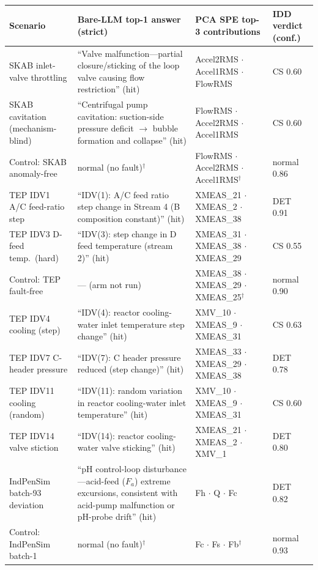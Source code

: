 \documentclass[preprint,10pt]{elsarticle}
\newcommand{\preprinttabfit}{\scriptsize\selectfont}%
\newcommand{\preprinttabfit}{}%
\begin{document}
\begin{table}[!t]
\label{tab:baselinedetail}
\centering
\footnotesize\setlength{\tabcolsep}{2.6pt}\renewcommand{\arraystretch}{1.02}\preprinttabfit
\begin{tabular}{@{}>{\raggedright\arraybackslash}p{2.3cm}>{\raggedright\arraybackslash}p{4.3cm}>{\raggedright\arraybackslash}p{3.4cm}>{\raggedright\arraybackslash}p{1.5cm}@{}}
\toprule
Scenario & Bare-LLM top-1 answer (strict) & PCA SPE top-3 contributions & IDD verdict (conf.) \\
\midrule
SKAB inlet-valve throttling & ``Valve malfunction---partial closure/sticking of the loop valve causing flow restriction'' (hit) & Accel2RMS $\cdot$ Accel1RMS $\cdot$ FlowRMS & CS 0.60 \\
SKAB cavitation (mechanism-blind) & ``Centrifugal pump cavitation: suction-side pressure deficit $\to$ bubble formation and collapse'' (hit) & FlowRMS $\cdot$ Accel2RMS $\cdot$ Accel1RMS & CS 0.60 \\
Control: SKAB anomaly-free & normal (no fault)$^\dagger$ & FlowRMS $\cdot$ Accel2RMS $\cdot$ Accel1RMS$^\dagger$ & normal 0.86 \\
\midrule
TEP IDV1 A/C feed-ratio step & ``IDV(1): A/C feed ratio step change in Stream 4 (B composition constant)'' (hit) & XMEAS\_21 $\cdot$ XMEAS\_2 $\cdot$ XMEAS\_38 & DET 0.91 \\
TEP IDV3 D-feed temp.\ (hard) & ``IDV(3): step change in D feed temperature (stream 2)'' (hit) & XMEAS\_31 $\cdot$ XMEAS\_38 $\cdot$ XMEAS\_29 & CS 0.55 \\
Control: TEP fault-free & --- (arm not run) & XMEAS\_38 $\cdot$ XMEAS\_29 $\cdot$ XMEAS\_25$^\dagger$ & normal 0.90 \\
TEP IDV4 cooling (step) & ``IDV(4): reactor cooling-water inlet temperature step change'' (hit) & XMV\_10 $\cdot$ XMEAS\_9 $\cdot$ XMEAS\_31 & CS 0.63 \\
TEP IDV7 C-header pressure & ``IDV(7): C header pressure reduced (step change)'' (hit) & XMEAS\_33 $\cdot$ XMEAS\_29 $\cdot$ XMEAS\_38 & DET 0.78 \\
TEP IDV11 cooling (random) & ``IDV(11): random variation in reactor cooling-water inlet temperature'' (hit) & XMV\_10 $\cdot$ XMEAS\_9 $\cdot$ XMEAS\_31 & CS 0.60 \\
TEP IDV14 valve stiction & ``IDV(14): reactor cooling-water valve sticking'' (hit) & XMEAS\_21 $\cdot$ XMEAS\_2 $\cdot$ XMV\_1 & DET 0.80 \\
\midrule
IndPenSim batch-93 deviation & ``pH control-loop disturbance---acid-feed ($F_a$) extreme excursions, consistent with acid-pump malfunction or pH-probe drift'' (hit) & Fh $\cdot$ Q $\cdot$ Fc & DET 0.82 \\
Control: IndPenSim batch-1 & normal (no fault)$^\dagger$ & Fc $\cdot$ Fs $\cdot$ Fb$^\dagger$ & normal 0.93 \\
\bottomrule
\end{tabular}
\end{table}
\end{document}
